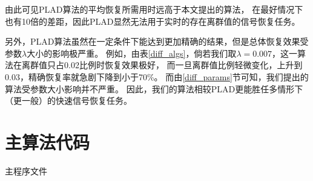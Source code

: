 \documentclass[AutoFakeBold]{LZUThesis}
\begin{document}
由此可见PLAD算法的平均恢复所需用时远高于本文提出的算法，
在最好情况下也有10倍的差距，因此PLAD显然无法用于实时的存在离群值的信号恢复任务。

另外，PLAD算法虽然在一定条件下能达到更加精确的结果，但是总体恢复效果受参数$\lambda$大小的影响极严重。
例如，由表\ref{diff_algs}，倘若我们取$\lambda=0.007$，这一算法在离群值只占0.02比例时恢复效果极好，
而一旦离群值比例轻微变化，上升到0.03，精确恢复率就急剧下降到小于70\%。
而由\ref{diff_params}节可知，我们提出的算法受参数大小影响并不严重。
因此，我们的算法相较PLAD更能胜任多情形下（更一般）的快速信号恢复任务。

% 


\backmatter


\printbib



\Appendix

\section{主算法代码}

主程序文件
\end{document}
